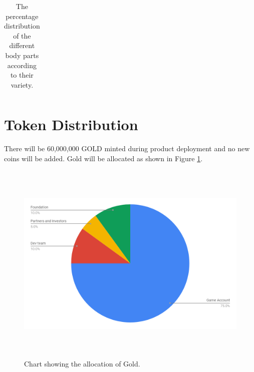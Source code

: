 \documentclass[12pt]{article}
\begin{document}
\begin{table}[!ht]
\begin{tabular}{p{0.84in}p{0.84in}}
\end{tabular}\caption{The percentage distribution of the different body parts according to their variety.}
\label{tab:The percentage distribution of the different body parts according to their variety.}

 \end{table}


\newpage

\vspace{\baselineskip}\section{Token Distribution}
\label{Token Distribution} \par

There will be 60,000,000 GOLD minted during product deployment and no new coins will be added. Gold will be allocated as shown in Figure \ref{fig:Chart_showing_the_allocation_of_Gold}.\par




\begin{figure}[H]
	\begin{FlushLeft}		\includegraphics[width=6.27in,height=3.88in]{./media/TDimage27.png}
		\caption{Chart showing the allocation of Gold.}
		\label{fig:Chart_showing_the_allocation_of_Gold}
	\end{FlushLeft}\end{figure}
\end{document}
